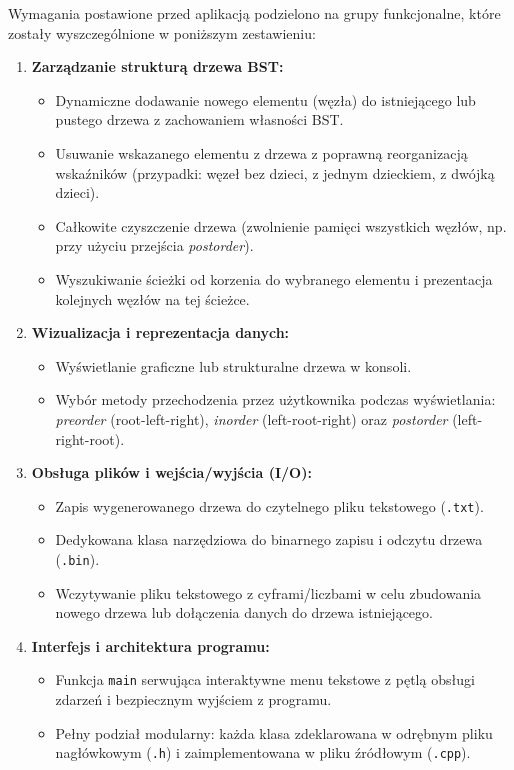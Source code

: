 \hspace{0.60cm}
Wymagania postawione przed aplikacją podzielono na grupy funkcjonalne, które zostały wyszczególnione w poniższym zestawieniu:

\begin{enumerate}
    \item \textbf{Zarządzanie strukturą drzewa BST:}
    \begin{itemize}
        \item Dynamiczne dodawanie nowego elementu (węzła) do istniejącego lub pustego drzewa z zachowaniem własności BST.
        \item Usuwanie wskazanego elementu z drzewa z poprawną reorganizacją wskaźników (przypadki: węzeł bez dzieci, z jednym dzieckiem, z dwójką dzieci).
        \item Całkowite czyszczenie drzewa (zwolnienie pamięci wszystkich węzłów, np. przy użyciu przejścia \textit{postorder}).
        \item Wyszukiwanie ścieżki od korzenia do wybranego elementu i prezentacja kolejnych węzłów na tej ścieżce.
    \end{itemize}

    \item \textbf{Wizualizacja i reprezentacja danych:}
    \begin{itemize}
        \item Wyświetlanie graficzne lub strukturalne drzewa w konsoli.
        \item Wybór metody przechodzenia przez użytkownika podczas wyświetlania: \textit{preorder} (root-left-right), \textit{inorder} (left-root-right) oraz \textit{postorder} (left-right-root).
    \end{itemize}

    \item \textbf{Obsługa plików i wejścia/wyjścia (I/O):}
    \begin{itemize}
        \item Zapis wygenerowanego drzewa do czytelnego pliku tekstowego (\texttt{.txt}).
        \item Dedykowana klasa narzędziowa do binarnego zapisu i odczytu drzewa (\texttt{.bin}).
        \item Wczytywanie pliku tekstowego z cyframi/liczbami w celu zbudowania nowego drzewa lub dołączenia danych do drzewa istniejącego.
    \end{itemize}

    \item \textbf{Interfejs i architektura programu:}
    \begin{itemize}
        \item Funkcja \texttt{main} serwująca interaktywne menu tekstowe z pętlą obsługi zdarzeń i bezpiecznym wyjściem z programu.
        \item Pełny podział modularny: każda klasa zdeklarowana w odrębnym pliku nagłówkowym (\texttt{.h}) i zaimplementowana w pliku źródłowym (\texttt{.cpp}).
    \end{itemize}
\end{enumerate}

